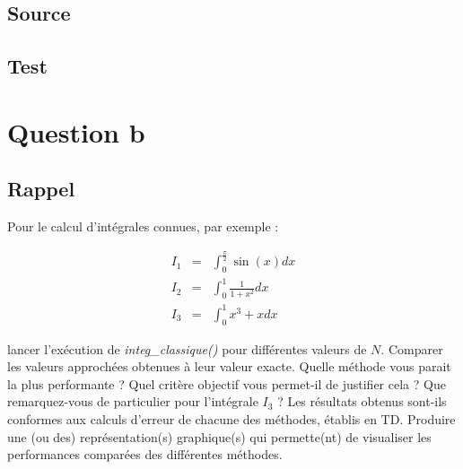\documentclass[a4paper,10pt]{report}
\begin{document}
\subsection*{Source}

\begin{center}
	
	
	
	
	
\end{center}

\subsection*{Test}


\begin{center}
%	
\end{center}


\section*{Question b}

\subsection*{Rappel}

Pour le calcul d’intégrales connues, par exemple :

\begin{eqnarray}
I_1 &=& \int_{0}^{\frac{\pi}{2}}\sin(x)dx\\
I_2 &=& \int_{0}^{1}\frac{1}{1 + x^2}dx\\
I_3 &=& \int_{0}^{1}x^3 + xdx
\end{eqnarray}

lancer l’exécution de \textit{integ\_classique()} pour différentes valeurs de $N$.
Comparer les valeurs approchées obtenues à leur valeur exacte. Quelle méthode vous parait la plus performante ? Quel critère objectif vous permet-il de justifier cela ? Que remarquez-vous de particulier pour l’intégrale $I_3$ ? Les résultats obtenus sont-ils conformes aux calculs d’erreur de chacune des méthodes, établis en TD.
Produire une (ou des) représentation(s) graphique(s) qui permette(nt) de visualiser les performances comparées des différentes méthodes.
\end{document}
